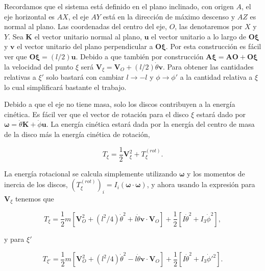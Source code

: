 \documentclass[a4paper,10pt]{article}
\numberwithin{equation}{section}
\begin{document}
Recordamos que el sistema está definido en el plano inclinado, con origen $A$, el eje 
horizontal es $AX$, el eje $AY$ está en la dirección de máximo descenso y $AZ$ es normal 
al plano. Las coordenadas del centro del eje, $O$, las denotaremos por $X$ y $Y$. Sea 
$\mathbf{K}$ el vector unitario normal al plano, $\mathbf{u}$ el vector unitario 
a lo largo de $\mathbf{O\xi}$ y $\mathbf{v}$ el vector unitario del plano perpendicular 
a $\mathbf{O\xi}$. Por esta construcción es fácil ver que $\mathbf{O\xi} = (l/2)\mathbf{u}$.
Debido a que también por construcción $\mathbf{A\xi} = \mathbf{AO} + \mathbf{O\xi}$ la 
velocidad del punto $\xi$ será $\mathbf{V}_\xi = \mathbf{V}_O + (l/2)\dot{\theta}\mathbf{v}$. 
Para obtener las cantidades relativas a $\xi'$ solo bastará con cambiar $l \rightarrow -l$ y 
$\phi \rightarrow \phi'$ a la cantidad relativa a $\xi$ lo cual simplificará 
bastante el trabajo.

\vspace{.3cm}

Debido a que el eje no tiene masa, solo los discos contribuyen a la energía 
cinética. Es fácil ver que el vector de rotación para el disco $\xi$ estará 
dado por $\mathbf{\omega} = \dot{\theta}\mathbf{K} + \dot{\phi}\mathbf{u}$. La 
energía cinética estará dada por la energía del centro de masa de la disco 
más la energía cinética de rotación,

\begin{equation}
 T_\xi = \frac{1}{2}\mathbf{V}_\xi^2 + T_\xi^{(rot)}.
\end{equation}

La energía rotacional se calcula simplemente utilizando $\mathbf{\omega}$ y
los momentos de inercia de los discos, $(T_\xi^{(rot)})_i = I_i(\mathbf{\omega}\cdot \mathbf{\omega})$, 
y ahora usando la expresión para $\mathbf{V}_\xi$ tenemos que 

\begin{equation}
 T_\xi = \frac{1}{2}m\left[\mathbf{V}_O^2 + (l^2/4)\dot{\theta}^2 +
 l\dot{\theta}\mathbf{v}\cdot\mathbf{V}_O \right]
 + \frac{1}{2}\left[ I\dot{\theta}^2 + I_3\dot{\phi}^2\right],
\end{equation}

y para $\xi'$

\begin{equation}
 T_{\xi'} = \frac{1}{2}m\left[\mathbf{V}_O^2 + (l^2/4)\dot{\theta}^2 
 - l\dot{\theta}\mathbf{v}\cdot\mathbf{V}_O \right]
 + \frac{1}{2}\left[ I\dot{\theta}^2 + I_3\dot{\phi}'^2\right].
\end{equation}
\end{document}
